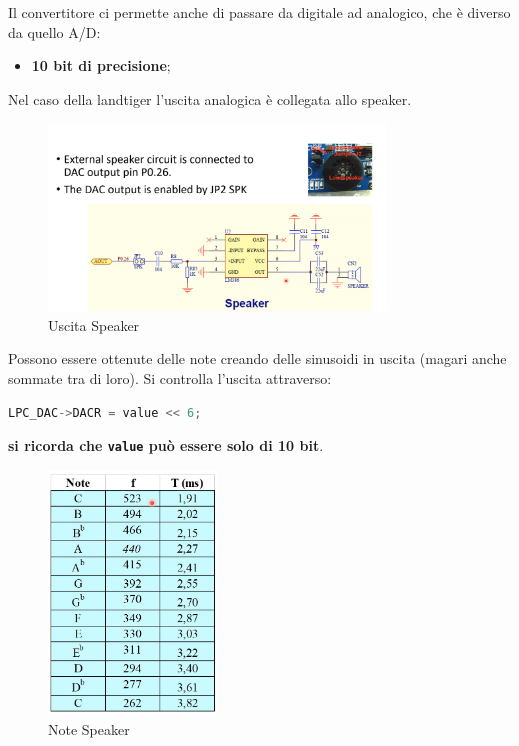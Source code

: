 \documentclass[12pt]{article}
\begin{document}
Il convertitore ci permette anche di passare da digitale ad analogico, che \`e diverso da quello A/D:
\begin{itemize}
    \item \textbf{10 bit di precisione};
\end{itemize}
Nel caso della landtiger l'uscita analogica \`e collegata allo speaker.
\begin{figure}[H]
    \centering
    \includegraphics[width=0.8\textwidth]{uscita-speaker.png}
    \caption{Uscita Speaker}
    \label{fig:uscita-speaker}
\end{figure}
Possono essere ottenute delle note creando delle sinusoidi in uscita (magari anche sommate tra di loro). Si controlla l'uscita attraverso:
\begin{lstlisting}[language=c]
LPC_DAC->DACR = value << 6;
\end{lstlisting}
\textbf{si ricorda che \texttt{value} pu\`o essere solo di 10 bit}.
\begin{figure}
    \centering
    \includegraphics[width=0.4\textwidth]{note-speaker.png}
    \caption{Note Speaker}
    \label{fig:note-speaker}
\end{figure}
\end{document}
